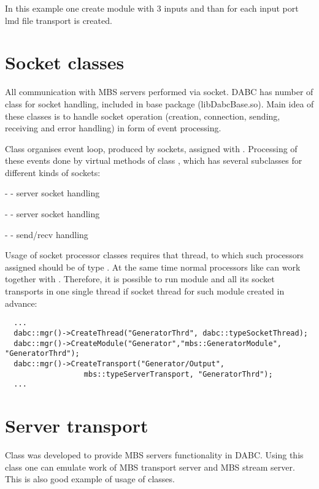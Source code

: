In this example one create module with 3 inputs and than for each input port lmd file transport is created.


\section{Socket classes}

All communication with MBS servers performed via socket. DABC has number
of class for socket handling, included in base package (libDabcBase.so).
Main idea of these classes is to handle socket operation (creation, connection, sending, receiving and 
error handling) in form of event processing. 

Class  organises event loop, produced by sockets, assigned with
. Processing of these events done by virtual methods
of class , which has several subclasses for different 
kinds of sockets: 
\bbul
\item  -  - server socket handling  
\item  -  - server socket handling  
\item  -  - send/recv handling  
\ebul

Usage of socket processor classes requires that thread, 
to which such processors assigned should be of type .
At the same time normal processors like  can work together
with . Therefore, it is possible to run module and all its
socket transports in one single thread if socket thread for such module created in
advance:

\begin{verbatim}
  ...
  dabc::mgr()->CreateThread("GeneratorThrd", dabc::typeSocketThread);
  dabc::mgr()->CreateModule("Generator","mbs::GeneratorModule", "GeneratorThrd");
  dabc::mgr()->CreateTransport("Generator/Output", 
                  mbs::typeServerTransport, "GeneratorThrd");
  ...
\end{verbatim}
    

\section{Server transport}

Class  was developed to provide MBS servers functionality in DABC.
Using this class one can emulate work of MBS transport server and MBS stream server. 
This is also good example of usage of  classes.

